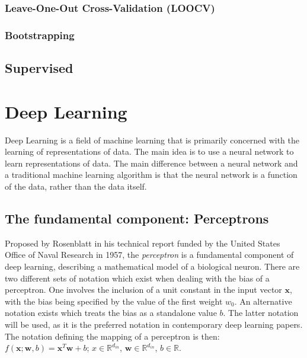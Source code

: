 \subsubsection{Leave-One-Out Cross-Validation (LOOCV)}

\subsubsection{Bootstrapping}

\subsection{Supervised}


\section{Deep Learning\label{sec:DL}}
Deep Learning is a field of machine learning that is primarily concerned with
the learning of representations of data. The main idea is to use a neural
network to learn representations of data. The main difference between a
neural network and a traditional machine learning algorithm is that the
neural network is a function of the data, rather than the data itself.

\subsection{The fundamental component: Perceptrons}

Proposed by Rosenblatt \cite{Rosenblatt_1957_6098} in his technical
report funded by the United States Office of Naval Research
\cite{doi:10.1177/030631296026003005} in 1957, the \textit{perceptron} is a
fundamental component of deep learning, describing a mathematical model of a
biological neuron. There are two different sets of notation which exist when
dealing with the bias of a perceptron. One involves the inclusion of a unit
constant in the input vector $\mathbf{x}$, with the bias being specified by the
value of the first weight $w_0$. An alternative notation exists which treats the
bias as a standalone value $b$. The latter notation will be used, as it is the
preferred notation in contemporary deep learning papers. The notation defining
the mapping of a perceptron is then: $f(\mathbf{x};\mathbf{w},
b)=\mathbf{x}^T\mathbf{w}+b$; $x\in\mathbb{R}^{d_{in}}$,
$\mathbf{w}\in\mathbb{R}^{d_{in}}$, $b\in\mathbb{R}$.

